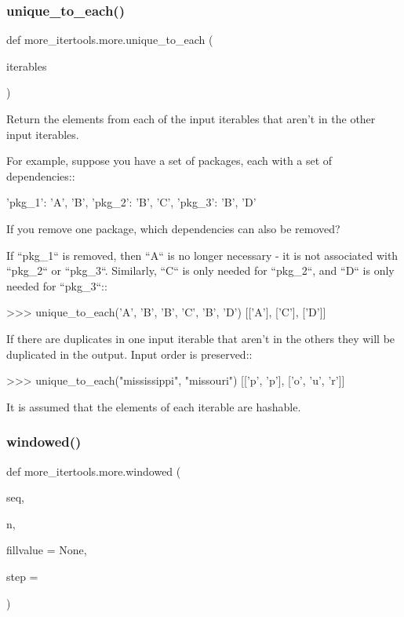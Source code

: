 \subsubsection{\texorpdfstring{unique\+\_\+to\+\_\+each()}{unique\_to\_each()}}
{\footnotesize\ttfamily def more\+\_\+itertools.\+more.\+unique\+\_\+to\+\_\+each (\begin{DoxyParamCaption}\item[{}]{iterables }\end{DoxyParamCaption})}

\begin{DoxyVerb}Return the elements from each of the input iterables that aren't in the
other input iterables.

For example, suppose you have a set of packages, each with a set of
dependencies::

    {'pkg_1': {'A', 'B'}, 'pkg_2': {'B', 'C'}, 'pkg_3': {'B', 'D'}}

If you remove one package, which dependencies can also be removed?

If ``pkg_1`` is removed, then ``A`` is no longer necessary - it is not
associated with ``pkg_2`` or ``pkg_3``. Similarly, ``C`` is only needed for
``pkg_2``, and ``D`` is only needed for ``pkg_3``::

    >>> unique_to_each({'A', 'B'}, {'B', 'C'}, {'B', 'D'})
    [['A'], ['C'], ['D']]

If there are duplicates in one input iterable that aren't in the others
they will be duplicated in the output. Input order is preserved::

    >>> unique_to_each("mississippi", "missouri")
    [['p', 'p'], ['o', 'u', 'r']]

It is assumed that the elements of each iterable are hashable.\end{DoxyVerb}
 \mbox{\label{namespacemore__itertools_1_1more_a711770e48f02edd5a51d08a435083bdd}} 
\subsubsection{\texorpdfstring{windowed()}{windowed()}}
{\footnotesize\ttfamily def more\+\_\+itertools.\+more.\+windowed (\begin{DoxyParamCaption}\item[{}]{seq,  }\item[{}]{n,  }\item[{}]{fillvalue = {\ttfamily None},  }\item[{}]{step = {} }\end{DoxyParamCaption})}

